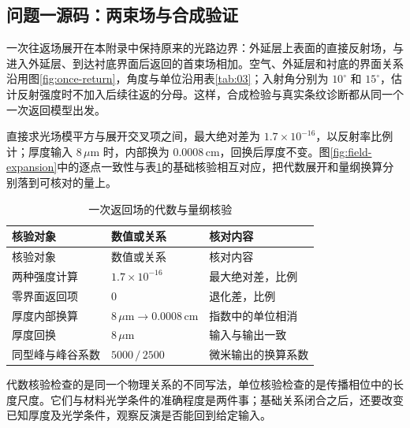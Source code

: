\subsection{问题一源码：两束场与合成验证}
\label{sec:appendix-q1}

一次往返场展开在本附录中保持原来的光路边界：外延层上表面的直接反射场，与进入外延层、到达衬底界面后返回的首束场相加。空气、外延层和衬底的界面关系沿用图\ref{fig:once-return}，角度与单位沿用表\ref{tab:03}；入射角分别为 $10^\circ$ 和 $15^\circ$，估计反射强度时不加入后续往返的分母。这样，合成检验与真实条纹诊断都从同一个一次返回模型出发。

直接求光场模平方与展开交叉项之间，最大绝对差为 $1.7\times10^{-16}$，以反射率比例计；厚度输入 $8\,\mu\mathrm{m}$ 时，内部换为 $0.0008\,\mathrm{cm}$，回换后厚度不变。图\ref{fig:field-expansion}中的逐点一致性与表\ref{tab:q1-appendix-checks}的基础核验相互对应，把代数展开和量纲换算分别落到可核对的量上。

\begingroup
\small
\renewcommand{\arraystretch}{1.15}
\begin{longtable}{>{\centering\arraybackslash}p{}>{\centering\arraybackslash}p{}>{\centering\arraybackslash}p{}}
\caption{一次返回场的代数与量纲核验}\label{tab:q1-appendix-checks}\\
\toprule
核验对象 & 数值或关系 & 核对内容 \\
\midrule
\endfirsthead
\toprule
核验对象 & 数值或关系 & 核对内容 \\
\midrule
\endhead
\bottomrule
\endfoot
两种强度计算 & $1.7\times10^{-16}$ & 最大绝对差，比例 \\
零界面返回项 & $0$ & 退化差，比例 \\
厚度内部换算 & $8\,\mu\mathrm{m}\to0.0008\,\mathrm{cm}$ & 指数中的单位相消 \\
厚度回换 & $8\,\mu\mathrm{m}$ & 输入与输出一致 \\
同型峰与峰谷系数 & $5000\,/\,2500$ & 微米输出的换算系数 \\
\end{longtable}
\endgroup

代数核验检查的是同一个物理关系的不同写法，单位核验检查的是传播相位中的长度尺度。它们与材料光学条件的准确程度是两件事；基础关系闭合之后，还要改变已知厚度及光学条件，观察反演是否能回到给定输入。

